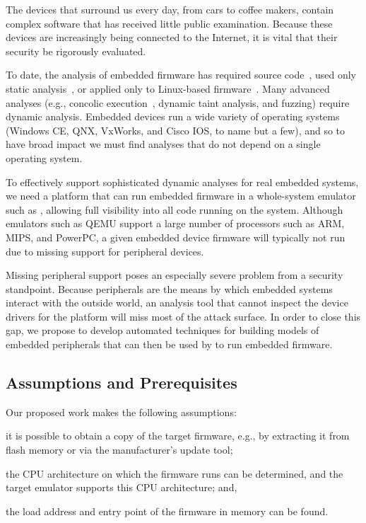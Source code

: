 The devices that surround us every day, from cars to coffee makers,
contain complex software that has received little public examination.
Because these devices are increasingly being connected to the Internet,
it is vital that their security be rigorously evaluated.

To date, the analysis of embedded firmware has required source
code~\cite{davidson:2013:fie}, used only static
analysis~\cite{dreissen:2012:satphone}, or applied only to Linux-based
firmware~\cite{schuster:2013:backdoor}. Many advanced analyses (e.g., concolic
execution~\cite{godefroid:2005:dart}, dynamic taint analysis, and
fuzzing) require dynamic analysis. Embedded devices run a wide variety
of operating systems (Windows CE, QNX, VxWorks, and Cisco IOS, to name
but a few), and so to have broad impact we must find analyses that do
not depend on a single operating system.

To effectively support sophisticated dynamic analyses for real embedded
systems, we need a platform that can run embedded firmware in a
whole-system emulator such as \dynamicsys, allowing full visibility
into all code running on the system. Although emulators such as QEMU
support a large number of processors such as ARM, MIPS, and PowerPC, a
given embedded device firmware will typically not run due to missing
support for peripheral devices.

Missing peripheral support poses an especially severe problem from a security
standpoint. Because peripherals are the means by which embedded systems
interact with the outside world, an analysis tool that cannot inspect the
device drivers for the platform will miss most of the attack surface. In order
to close this gap, we propose to develop automated techniques for building
models of embedded peripherals that can then be used by \dynamicsys to run
embedded firmware.

\subsection{Assumptions and Prerequisites}

Our proposed work makes the following assumptions:%
\begin{inparaenum}
    \item it is possible to obtain a copy of the target firmware, e.g.,
    by extracting it from flash memory or via the manufacturer's update
    tool;
    \item the CPU architecture on which the firmware runs can be
    determined, and the target emulator supports this CPU architecture;
    and,
    \item the load address and entry point of the firmware in memory can
    be found.
\end{inparaenum}

